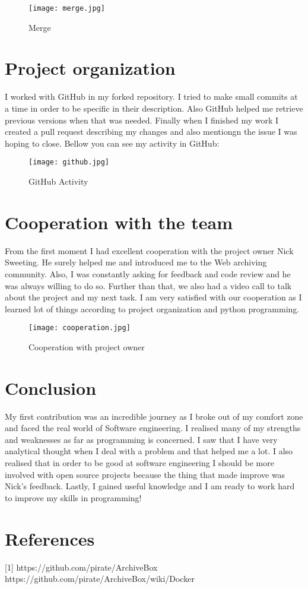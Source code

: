 \documentclass{article}
\begin{document}
\begin{figure}[tph!]
\centerline{\texttt{[image: merge.jpg]}}
    \caption{Merge}
    \label{fig:verticalcell}
\end{figure}

\section{Project organization}
I worked with GitHub in my forked repository. I tried to make small commits at a time in order to be specific in their description. Also GitHub helped me retrieve previous versions when that was needed. Finally when I finished my work I created a pull request describing my changes and also mentiongn the issue I was hoping to close. Bellow you can see my activity in GitHub:
\begin{figure}[tph!]
\centerline{\texttt{[image: github.jpg]}}
    \caption{GitHub Activity}
    \label{fig:verticalcell}
\end{figure}

\section{Cooperation with the team}

From the first moment I had excellent cooperation with the project owner Nick Sweeting. He surely helped me and introduced me to the Web archiving community. Also, I was constantly asking for feedback and code review and he was always willing to do so. Further than that, we also had a video call to talk about the project and my next task. I am very satisfied with our cooperation as I learned lot of things according to project organization and python programming. 

\begin{figure}[tph!]
\centerline{\texttt{[image: cooperation.jpg]}}
    \caption{Cooperation with project owner}
    \label{fig:verticalcell}
\end{figure}

\section{Conclusion}
My first contribution was an incredible journey as I broke out of my comfort zone and faced the real world of Software engineering. I realised many of my strengths and weaknesses as far as programming is concerned. I saw that I have very analytical thought when I deal with a problem and that helped me a lot. I also realised that in order to be good at software engineering I should be more involved with open source projects because the thing that made improve was Nick's feedback. Lastly, I gained useful knowledge and I am ready to work hard to improve my skills in programming!

\section*{References}
[1] https://github.com/pirate/ArchiveBox 
\newline
[2]https://github.com/pirate/ArchiveBox/wiki/Docker
\end{document}
